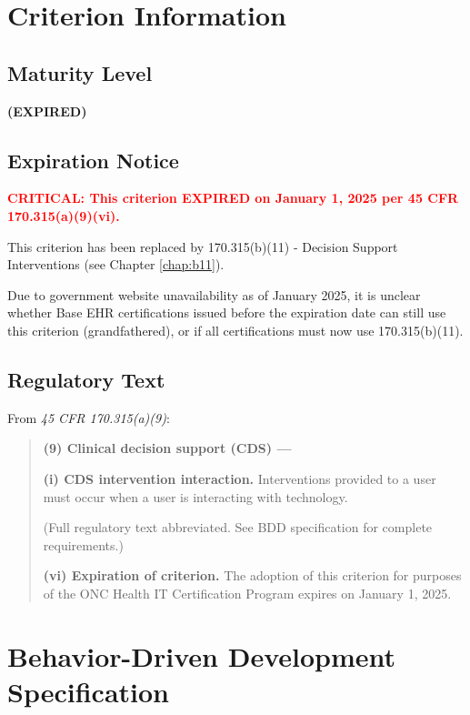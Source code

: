 \section{Criterion Information}

\subsection{Maturity Level}
 \textbf{(EXPIRED)}

\subsection{Expiration Notice}

\textcolor{red}{\textbf{CRITICAL: This criterion EXPIRED on January 1, 2025 per 45 CFR \textsection{} 170.315(a)(9)(vi).}}

This criterion has been replaced by \textsection{} 170.315(b)(11) - Decision Support Interventions (see Chapter \ref{chap:b11}).

Due to government website unavailability as of January 2025, it is unclear whether Base EHR certifications issued before the expiration date can still use this criterion (grandfathered), or if all certifications must now use \textsection{} 170.315(b)(11).

\subsection{Regulatory Text}

From \textit{45 CFR \textsection{} 170.315(a)(9)}:

\begin{quotation}
\textbf{(9) Clinical decision support (CDS) ---}

\textbf{(i) CDS intervention interaction.} Interventions provided to a user must occur when a user is interacting with technology.

(Full regulatory text abbreviated. See BDD specification for complete requirements.)

\textbf{(vi) Expiration of criterion.} The adoption of this criterion for purposes of the ONC Health IT Certification Program expires on January 1, 2025.
\end{quotation}

\section{Behavior-Driven Development Specification}

